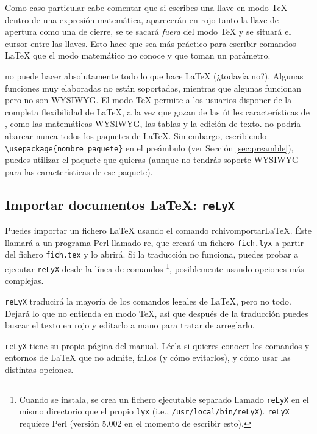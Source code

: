 Como caso particular cabe comentar que si escribes una llave en modo
\TeX{} dentro de una expresión matemática, aparecerán en rojo tanto
la llave de apertura como una de cierre, se te sacará \emph{fuera}
del modo \TeX{} y se situará el cursor entre las llaves. Esto hace
que sea más práctico para escribir comandos \LaTeX{} que el modo matemático
no conoce y que toman un parámetro.

\LyX{} no puede hacer absolutamente todo lo que hace \LaTeX{} (¿todavía
no?). Algunas funciones muy elaboradas no están soportadas, mientras
que algunas funcionan pero no son WYSIWYG. El modo \TeX{} permite
a los usuarios disponer de la completa flexibilidad de \LaTeX{}, a
la vez que gozan de las útiles características de \LyX{}, como las
matemáticas WYSIWYG, las tablas y la edición de texto. \LyX{} no podría
abarcar nunca todos los paquetes de \LaTeX{}. Sin embargo, escribiendo
\texttt{\textbackslash{}usepackage\{nombre\_paquete\}} en el preámbulo
(ver Sección \ref{sec:preamble}), puedes utilizar el paquete que
quieras (aunque no tendrás soporte WYSIWYG para las características
de ese paquete).


\subsection{Importar documentos \LaTeX{}: \texttt{reLyX}}

\label{sec:relyx}Puedes importar un fichero \LaTeX{} usando el comando
\textsf{}\textsf{rchivo\lyxarrow{}}\textsf{}\textsf{mportar\lyxarrow{}\LaTeX{}}.
Éste llamará a un programa Perl llamado re\LyX{}, que creará un fichero
\texttt{fich.lyx} a partir del fichero \texttt{fich.tex} y lo abrirá.
Si la traducción no funciona, puedes probar a ejecutar \texttt{reLyX}
desde la línea de comandos%
\footnote{Cuando \LyX{} se instala, se crea un fichero ejecutable separado llamado
\texttt{reLyX} en el mismo directorio que el propio \texttt{lyx} (i.e.,
\texttt{/usr/local/bin/reLyX}). \texttt{reLyX} requiere Perl (versión
5.002 en el momento de escribir esto).%
}, posiblemente usando opciones más complejas.

\texttt{reLyX} traducirá la mayoría de los comandos legales de \LaTeX{},
pero no todo. Dejará lo que no entienda en modo \TeX{}, así que después
de la traducción puedes buscar el texto en rojo y editarlo a mano
para tratar de arreglarlo.

\texttt{reLyX} tiene su propia página del manual. Léela si quieres
conocer los comandos y entornos de \LaTeX{} que no admite, fallos
(y cómo evitarlos), y cómo usar las distintas opciones.



